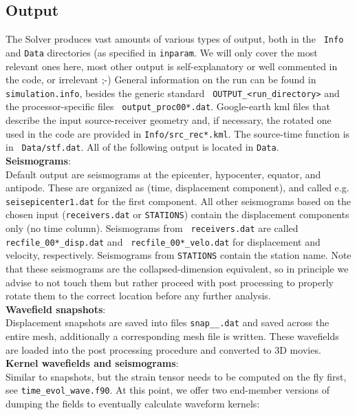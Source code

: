 \documentclass[11pt,letter,fleqn,english,notitlepage]{article}
\begin{document}
\subsection{Output}
The Solver produces vast amounts of various types of output, both in the {\tt
Info} and {\tt Data} directories (as specified in {\tt inparam}. We will only
cover the most relevant ones here, most other output is self-explanatory or
well commented in the code, or irrelevant ;-) General information on the run
can be found in {\tt simulation.info}, besides the generic standard {\tt
OUTPUT\_<run\_directory>} and the processor-specific files {\tt
output\_proc00*.dat}. Google-earth kml files that describe the input
source-receiver geometry and, if necessary, the rotated one used in the code
are provided in {\tt Info/src\_rec*.kml}.  The source-time function is in {\tt
Data/stf.dat}. All of the following output is located in {\tt Data}.\\

\noindent \textbf{Seismograms}: \\
Default output are seismograms at the epicenter, hypocenter, equator, and
antipode. These are organized as (time, displacement component), and called
e.g. {\tt seisepicenter1.dat} for the first component.  All other seismograms
based on the chosen input ({\tt receivers.dat} or {\tt STATIONS}) contain the
displacement components only (no time column). Seismograms from {\tt
receivers.dat} are called {\tt recfile\_00*\_disp.dat} and {\tt
recfile\_00*\_velo.dat} for displacement and velocity, respectively.
Seismograms from {\tt STATIONS} contain the station name. Note that these
seismograms are the collapsed-dimension equivalent, so in principle we advise
to not touch them but rather proceed with post processing to properly rotate
them to the correct location before any further analysis.\\

\noindent \textbf{Wavefield snapshots}:\\
Displacement snapshots are saved into files {\tt snap\_<proc number>\_<time sample>.dat}
and saved across the entire mesh, additionally a corresponding mesh file is written.
These wavefields are loaded into the post processing procedure and converted to 3D 
movies.\\

\noindent \textbf{Kernel wavefields and seismograms}: \\
Similar to snapshots, but the strain tensor needs to be computed on the fly
first, see {\tt time\_evol\_wave.f90}.  At this point, we offer two end-member
versions of dumping the fields to eventually calculate waveform kernels:
\end{document}
